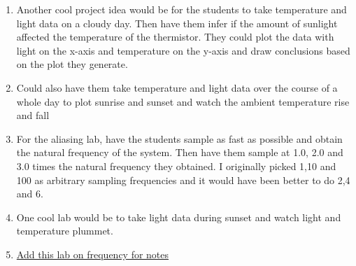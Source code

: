 \begin{enumerate}[itemsep=-5pt]
\item Another cool project idea would be for the students to take temperature and light data on a cloudy day. Then have them infer if the amount of sunlight affected the temperature of the thermistor. They could plot the data with light on the x-axis and temperature on the y-axis and draw conclusions based on the plot they generate.
\item Could also have them take temperature and light data over the course of a whole day to plot sunrise and sunset and watch the ambient temperature rise and fall
\item For the aliasing lab, have the students sample as fast as possible and obtain the natural frequency of the system. Then have them sample at 1.0, 2.0 and 3.0 times the natural frequency they obtained. I originally picked 1,10 and 100 as arbitrary sampling frequencies and it would have been better to do 2,4 and 6.
\item One cool lab would be to take light data during sunset and watch light and temperature plummet.
\item \href{https://learn.adafruit.com/circuit-playground-o-phonor/musical-note-basics}{Add this lab on frequency for notes}
\end{enumerate}
